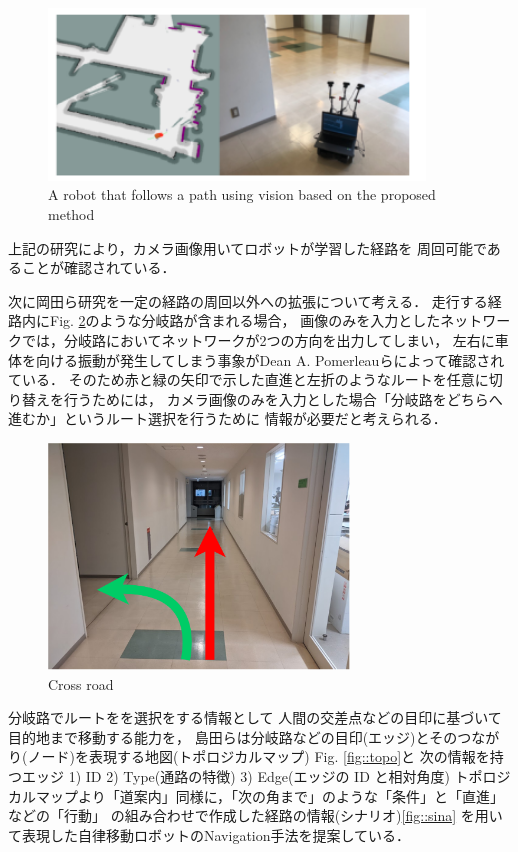 \begin{figure}[h]
    \centering
    \includegraphics[width = 10cm]{./figs/okada.png}
    \caption{A robot that follows a path using vision based on the proposed method\cite{okada}}
    \label{fig::okada}
\end{figure}

\newpage
上記の研究により，カメラ画像用いてロボットが学習した経路を
周回可能であることが確認されている．


次に岡田ら\cite{okada}研究を一定の経路の周回以外への拡張について考える．
走行する経路内にFig. \ref{fig::bunki}のような分岐路が含まれる場合，
画像のみを入力としたネットワークでは，分岐路においてネットワークが2つの方向を出力してしまい，
左右に車体を向ける振動が発生してしまう事象がDean A. Pomerleauら\cite{pomeru}によって確認されている．
そのため赤と緑の矢印で示した直進と左折のようなルートを任意に切り替えを行うためには，
カメラ画像のみを入力とした場合「分岐路をどちらへ進むか」というルート選択を行うために
情報が必要だと考えられる．
 \vspace{4.0zh}
\begin{figure}[h]
    \centering
    \includegraphics[width = 8cm]{./figs/bunki.pdf}
    \caption{Cross road}
    \label{fig::bunki}
\end{figure}
\newpage

分岐路でルートをを選択をする情報として
人間の交差点などの目印に基づいて目的地まで移動する能力を，
島田らは分岐路などの目印(エッジ)とそのつながり(ノード)を表現する地図(トポロジカルマップ)
Fig. \ref{fig::topo}と
次の情報を持つエッジ
1) ID
2) Type(通路の特徴)
3) Edge(エッジの ID と相対角度)
トポロジカルマップより「道案内」同様に，「次の角まで」のような「条件」と「直進」などの「行動」
の組み合わせで作成した経路の情報(シナリオ)\ref{fig::sina}
を用いて表現した自律移動ロボットのNavigation手法を提案している．

